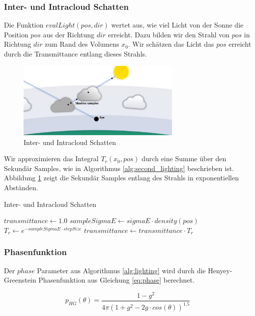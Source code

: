 \subsubsection{Inter- und Intracloud Schatten}
Die Funktion $ evalLight(pos, dir) $ wertet aus, wie viel Licht von der Sonne die Position $ pos $ aus der Richtung $ dir $ erreicht. Dazu bilden wir den Strahl von $ pos $ in Richtung $ dir $ zum Rand des Volumens $ x_0 $. Wir schätzen das Licht das $ pos $ erreicht durch die Transmittance entlang dieses Strahls.

\begin{figure}[H]
    \centering
    \includegraphics[width=8cm]{figures/cloud-shadow.png}
    \caption{Inter- und Intracloud Schatten \cite{Högfeldt16}}
    \label{fig:shadow}
\end{figure}

Wir approximieren das Integral $ T_r(x_0, pos) $ durch eine Summe über den Sekundär Samples, wie in Algorithmus \ref{alg:second_lighting} beschrieben ist. Abbildung \ref{fig:shadow} zeigt die Sekundär Samples entlang des Strahls in exponentiellen Abständen.

\begin{algorithm}[H]
\caption{Inter- und Intracloud Schatten}
\label{alg:second_lighting}
\begin{algorithmic}[1]
\State $ transmittance \gets 1.0 $
    \State $ sampleSigmaE \gets sigmaE \cdot density(pos) $
    \State $ T_r \gets e^{-sampleSigmaE \cdot stepSize} $
    \State $ transmittance \gets transmittance \cdot T_r $
\EndFor
\end{algorithmic}
\end{algorithm}

\subsubsection{Phasenfunktion}
Der $ phase $ Parameter aus Algorithmus \ref{alg:lighting} wird durch die Henyey-Greenstein Phasenfunktion \cite{Henyey41} aus Gleichung \ref{eq:phase} berechnet.

\begin{equation}
\label{eq:phase}
    p_{HG}(\theta) = \frac{1 - g^2}{4\pi (1 + g^2 - 2g \cdot cos(\theta))^{1.5}}
\end{equation}

